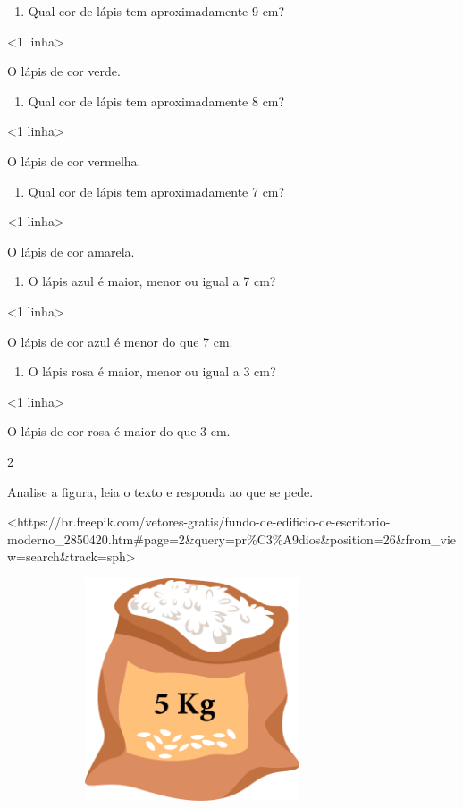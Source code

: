 {\begin{enumerate}
\def\labelenumi{\alph{enumi})}
\item
  Qual cor de lápis tem aproximadamente 9 cm?
\end{enumerate}

\textless{}1 linha\textgreater{}

O lápis de cor verde.

\begin{enumerate}
\def\labelenumi{\alph{enumi})}
\item
  Qual cor de lápis tem aproximadamente 8 cm?
\end{enumerate}

\textless{}1 linha\textgreater{}

O lápis de cor vermelha.

\begin{enumerate}
\def\labelenumi{\alph{enumi})}
\item
  Qual cor de lápis tem aproximadamente 7 cm?
\end{enumerate}

\textless{}1 linha\textgreater{}

O lápis de cor amarela.

\begin{enumerate}
\def\labelenumi{\alph{enumi})}
\item
  O lápis azul é maior, menor ou igual a 7 cm?
\end{enumerate}

\textless{}1 linha\textgreater{}

O lápis de cor azul é menor do que 7 cm.

\begin{enumerate}
\def\labelenumi{\alph{enumi})}
\item
  O lápis rosa é maior, menor ou igual a 3 cm?
\end{enumerate}

\textless{}1 linha\textgreater{}

O lápis de cor rosa é maior do que 3 cm.

\num{2}

Analise a figura, leia o texto e responda ao que se pede.

\textless{}https://br.freepik.com/vetores-gratis/fundo-de-edificio-de-escritorio-moderno\_2850420.htm\#page=2\&query=pr\%C3\%A9dios\&position=26\&from\_view=search\&track=sph\textgreater{}

\includegraphics[width=4.31250in,height=2.59651in]{media/image43.png}

}
